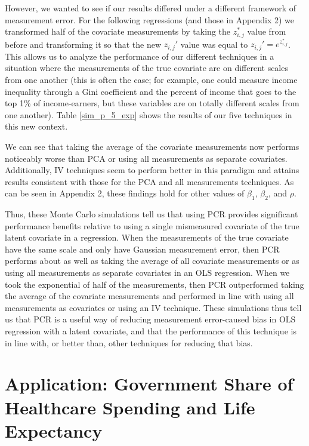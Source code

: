 \documentclass[10pt]{article}
\begin{document}
However, we wanted to see if our results differed under a different framework of measurement error. For the following regressions (and those in Appendix 2) we transformed half of the covariate measurements by taking the $z_{i,j}^*$ value from before and transforming it so that the new $z_{i,j}'$ value was equal to $z_{i,j}' = e^{z_{i,j}^*}$. This allows us to analyze the performance of our different techniques in a situation where the measurements of the true covariate are on different scales from one another (this is often the case; for example, one could measure income inequality through a Gini coefficient and the percent of income that goes to the top 1\% of income-earners, but these variables are on totally different scales from one another). Table \ref{sim_p_5_exp} shows the results of our five techniques in this new context.



We can see that taking the average of the covariate measurements now performs noticeably worse than PCA or using all measurements as separate covariates. Additionally, IV techniques seem to perform better in this paradigm and attains results consistent with those for the PCA and all measurements techniques. As can be seen in Appendix 2, these findings hold for other values of $\beta_1$, $\beta_2$, and $\rho$.

Thus, these Monte Carlo simulations tell us that using PCR provides significant performance benefits relative to using a single mismeasured covariate of the true latent covariate in a regression. When the measurements of the true covariate have the same scale and only have Gaussian measurement error, then PCR performs about as well as taking the average of all covariate measurements or as using all measurements as separate covariates in an OLS regression. When we took the exponential of half of the measurements, then PCR outperformed taking the average of the covariate measurements and performed in line with using all measurements as covariates or using an IV technique. These simulations thus tell us that PCR is a useful way of reducing measurement error-caused bias in OLS regression with a latent covariate, and that the performance of this technique is in line with, or better than, other techniques for reducing that bias.

    \section*{Application: Government Share of Healthcare Spending and Life Expectancy}
\end{document}
